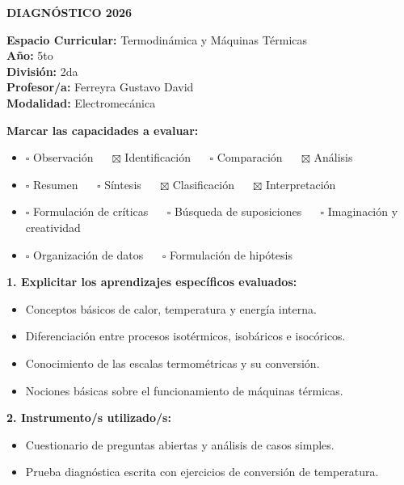 \documentclass[11pt, a4paper]{article}
\begin{document}
\noindent\colorbox{schoolgreen}{\begin{minipage}{\dimexpr\textwidth-2\fboxsep}\centering \textbf{\fontsize{14}{16}\selectfont DIAGNÓSTICO 2026}\end{minipage}}

\vspace{1.5em}

\begin{flushleft}
\textbf{Espacio Curricular:} Termodinámica y Máquinas Térmicas \\
\textbf{Año:} 5to \\
\textbf{División:} 2da \\
\textbf{Profesor/a:} Ferreyra Gustavo David \\
\textbf{Modalidad:} Electromecánica
\end{flushleft}

\vspace{1em}

\noindent \textbf{Marcar las capacidades a evaluar:}

\begin{itemize}
\item $\square$ Observación $\quad$ $\boxtimes$ Identificación $\quad$ $\square$ Comparación $\quad$ $\boxtimes$ Análisis
\item $\square$ Resumen $\quad$ $\square$ Síntesis $\quad$ $\boxtimes$ Clasificación $\quad$ $\boxtimes$ Interpretación
\item $\square$ Formulación de críticas $\quad$ $\square$ Búsqueda de suposiciones $\quad$ $\square$ Imaginación y creatividad
\item $\square$ Organización de datos $\quad$ $\square$ Formulación de hipótesis
\end{itemize}

\vspace{1em}

\noindent \textbf{1. Explicitar los aprendizajes específicos evaluados:}
\begin{itemize}
\item Conceptos básicos de calor, temperatura y energía interna.
\item Diferenciación entre procesos isotérmicos, isobáricos e isocóricos.
\item Conocimiento de las escalas termométricas y su conversión.
\item Nociones básicas sobre el funcionamiento de máquinas térmicas.
\end{itemize}

\noindent \textbf{2. Instrumento/s utilizado/s:}
\begin{itemize}
\item Cuestionario de preguntas abiertas y análisis de casos simples.
\item Prueba diagnóstica escrita con ejercicios de conversión de temperatura.
\end{itemize}
\end{document}
